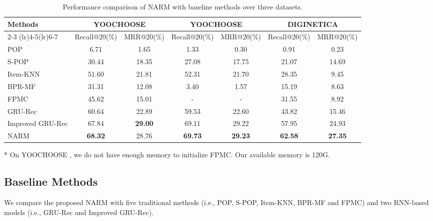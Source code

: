 \documentclass[sigconf]{acmart}
\begin{document}
    \begin{table*}
  	    \vspace{1.2em}
  	    \begin{threeparttable}
	        \caption{Performance comparison of NARM with baseline methods over three datasets.}
	        \label{tab:decoder comparision}
            \begin{tabular}{lcccccc}
		        \toprule
		        \multirow{3}{*}{Methods} & \multicolumn{2}{c}{YOOCHOOSE } & \multicolumn{2}{c}{YOOCHOOSE } & \multicolumn{2}{c}{DIGINETICA}\\
    	        \cmidrule(lr){2-3} \cmidrule(lr){4-5}\cmidrule(lr){6-7}
			        & Recall@20(\%) & MRR@20(\%) & Recall@20(\%) & MRR@20(\%) & Recall@20(\%) & MRR@20(\%)\\
    	        \midrule
    		        POP & 6.71 & 1.65 & 1.33 & 0.30 & 0.91 & 0.23\\
    		        S-POP & 30.44 & 18.35 & 27.08 & 17.75 & 21.07 & 14.69\\
    		        Item-KNN & 51.60 & 21.81 & 52.31 & 21.70 & 28.35 & 9.45\\
    		        BPR-MF & 31.31 & 12.08 & 3.40 & 1.57 & 15.19 & 8.63\\
    		        FPMC\tnote{*} & 45.62 & 15.01 & - & - & 31.55 & 8.92\\
    	        \midrule
    		        GRU-Rec & 60.64 & 22.89 & 59.53 & 22.60 & 43.82 & 15.46\\
    		        Improved GRU-Rec & 67.84 & \textbf{29.00} & 69.11 & 29.22 & 57.95 & 24.93\\
    		        NARM & \textbf{68.32} & 28.76 & \textbf{69.73} & \textbf{29.23} & \textbf{62.58} & \textbf{27.35}\\
    	        \bottomrule
            \end{tabular}
      
            \begin{tablenotes}
      	        \item[*] On YOOCHOOSE , we do not have enough memory to initialize FPMC. Our available memory is 120G.
            \end{tablenotes}
      
        \end{threeparttable}
    \end{table*}

\subsection{Baseline Methods}
We compare the proposed NARM with five traditional methods (i.e., POP, S-POP, Item-KNN, BPR-MF and FPMC) and two RNN-based models (i.e., GRU-Rec and Improved GRU-Rec).
  
\end{document}
